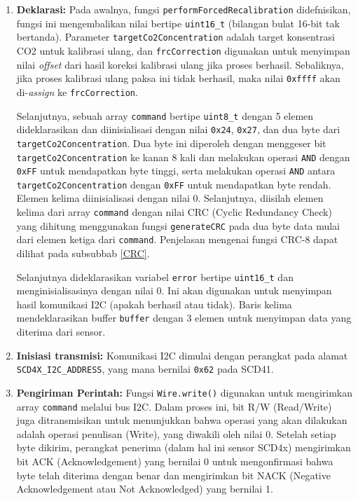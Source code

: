         \begin{enumerate}
            \item \textbf{Deklarasi:} Pada awalnya, fungsi \texttt{performForcedRecalibration} didefnisikan, fungsi ini mengembalikan nilai bertipe \texttt{uint16\_t} (bilangan bulat 16-bit tak bertanda). Parameter \texttt{targetCo2Concentration} adalah target konsentrasi CO2 untuk kalibrasi ulang, dan \texttt{frcCorrection} digunakan untuk menyimpan nilai \textit{offset} dari hasil koreksi kalibrasi ulang jika proses berhasil. Sebaliknya, jika proses kalibrasi ulang paksa ini tidak berhasil, maka nilai \texttt{0xffff} akan di-\textit{assign} ke \texttt{frcCorrection}.

            Selanjutnya, sebuah array \texttt{command} bertipe \texttt{uint8\_t} dengan 5 elemen dideklarasikan dan diinisialisasi dengan nilai \texttt{0x24}, \texttt{0x27}, dan dua byte dari \\ \texttt{targetCo2Concentration}. Dua byte ini diperoleh dengan menggeser bit \texttt{targetCo2Concentration} ke kanan 8 kali dan melakukan operasi \texttt{AND} dengan \texttt{0xFF} untuk mendapatkan byte tinggi, serta melakukan operasi \texttt{AND} antara \texttt{targetCo2Concentration} dengan \texttt{0xFF} untuk mendapatkan byte rendah. Elemen kelima diinisialisasi dengan nilai 0. Selanjutnya, diisilah elemen kelima dari array \texttt{command} dengan nilai CRC (Cyclic Redundancy Check) yang dihitung menggunakan fungsi \texttt{generateCRC} pada dua byte data mulai dari elemen ketiga dari \texttt{command}. Penjelasan mengenai fungsi CRC-8 dapat dilihat pada subsubbab \ref{CRC}.

            Selanjutnya dideklarasikan variabel \texttt{error} bertipe \texttt{uint16\_t} dan menginisialisasinya dengan nilai 0. Ini akan digunakan untuk menyimpan hasil komunikasi I2C (apakah berhasil atau tidak). Baris kelima mendeklarasikan buffer \texttt{buffer} dengan 3 elemen untuk menyimpan data yang diterima dari sensor.
            
            \item \textbf{Inisiasi transmisi:} Komunikasi I2C dimulai dengan perangkat pada alamat \\ \texttt{SCD4X\_I2C\_ADDRESS}, yang mana bernilai \texttt{0x62} pada SCD41.

            \item \textbf{Pengiriman Perintah:} Fungsi \texttt{Wire.write()} digunakan untuk mengirimkan array \texttt{command} melalui bus I2C. Dalam proses ini, bit R/W (Read/Write) juga ditransmisikan untuk menunjukkan bahwa operasi yang akan dilakukan adalah operasi penulisan (Write), yang diwakili oleh nilai 0. Setelah setiap byte dikirim, perangkat penerima (dalam hal ini sensor SCD4x) mengirimkan bit ACK (Acknowledgement) yang bernilai 0 untuk mengonfirmasi bahwa byte telah diterima dengan benar dan mengirimkan bit NACK (Negative Acknowledgement atau Not Acknowledged) yang bernilai 1.


\end{enumerate}
